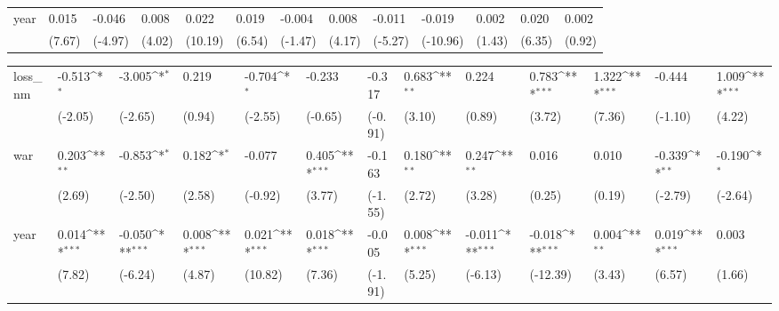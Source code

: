 \begin{tabular}{p{1.5cm} p{1.7cm} p{1.7cm} p{1.7cm} p{1.7cm} p{1.7cm} p{1.7cm} p{1.7cm} p{1.7cm} p{1.7cm} p{1.7cm} p{1.7cm} p{1.7cm}}
year            &    0.015\sym{***}&   -0.046\sym{***}&    0.008\sym{***}&    0.022\sym{***}&    0.019\sym{***}&   -0.004         &    0.008\sym{***}&   -0.011\sym{***}&   -0.019\sym{***}&    0.002         &    0.020\sym{***}&    0.002         \\
                &   (7.67)         &  (-4.97)         &   (4.02)         &  (10.19)         &   (6.54)         &  (-1.47)         &   (4.17)         &  (-5.27)         & (-10.96)         &   (1.43)         &   (6.35)         &   (0.92)         \\
\end{tabular}
\def\sym#1{\ifmmode^{#1}\else\(^{#1}\)\fi}
\begin{tabular}{p{1.5cm} p{1.7cm} p{1.7cm} p{1.7cm} p{1.7cm} p{1.7cm} p{1.7cm} p{1.7cm} p{1.7cm} p{1.7cm} p{1.7cm} p{1.7cm} p{1.7cm}}
\hline
loss\_nm         &   -0.513\sym{*}  &   -3.005\sym{*}  &    0.219         &   -0.704\sym{*}  &   -0.233         &   -0.317         &    0.683\sym{**} &    0.224         &    0.783\sym{***}&    1.322\sym{***}&   -0.444         &    1.009\sym{***}\\
                &  (-2.05)         &  (-2.65)         &   (0.94)         &  (-2.55)         &  (-0.65)         &  (-0.91)         &   (3.10)         &   (0.89)         &   (3.72)         &   (7.36)         &  (-1.10)         &   (4.22)         \\
war             &    0.203\sym{**} &   -0.853\sym{*}  &    0.182\sym{*}  &   -0.077         &    0.405\sym{***}&   -0.163         &    0.180\sym{**} &    0.247\sym{**} &    0.016         &    0.010         &   -0.339\sym{**} &   -0.190\sym{*}  \\
                &   (2.69)         &  (-2.50)         &   (2.58)         &  (-0.92)         &   (3.77)         &  (-1.55)         &   (2.72)         &   (3.28)         &   (0.25)         &   (0.19)         &  (-2.79)         &  (-2.64)         \\
year            &    0.014\sym{***}&   -0.050\sym{***}&    0.008\sym{***}&    0.021\sym{***}&    0.018\sym{***}&   -0.005         &    0.008\sym{***}&   -0.011\sym{***}&   -0.018\sym{***}&    0.004\sym{**} &    0.019\sym{***}&    0.003         \\
                &   (7.82)         &  (-6.24)         &   (4.87)         &  (10.82)         &   (7.36)         &  (-1.91)         &   (5.25)         &  (-6.13)         & (-12.39)         &   (3.43)         &   (6.57)         &   (1.66)         \\
\end{tabular}

